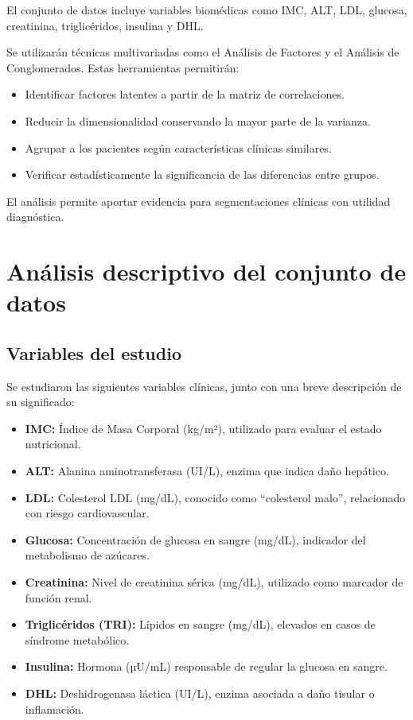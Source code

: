 \documentclass[12pt]{report}
\begin{document}
El conjunto de datos incluye variables biomédicas como IMC, ALT, LDL, glucosa, creatinina, triglicéridos, insulina y DHL. 

Se utilizarán técnicas multivariadas como el Análisis de Factores y el Análisis de Conglomerados. Estas herramientas permitirán:

\begin{itemize}
    \item Identificar factores latentes a partir de la matriz de correlaciones.
    \item Reducir la dimensionalidad conservando la mayor parte de la varianza.
    \item Agrupar a los pacientes según características clínicas similares.
    \item Verificar estadísticamente la significancia de las diferencias entre grupos.
\end{itemize}

El análisis permite aportar evidencia para segmentaciones clínicas con utilidad diagnóstica.

\chapter{Análisis descriptivo del conjunto de datos}

\section{Variables del estudio}
Se estudiaron las siguientes variables clínicas, junto con una breve descripción de su significado:

\begin{itemize}
    \item \textbf{IMC:} Índice de Masa Corporal (kg/m²), utilizado para evaluar el estado nutricional.
    \item \textbf{ALT:} Alanina aminotransferasa (UI/L), enzima que indica daño hepático.
    \item \textbf{LDL:} Colesterol LDL (mg/dL), conocido como “colesterol malo”, relacionado con riesgo cardiovascular.
    \item \textbf{Glucosa:} Concentración de glucosa en sangre (mg/dL), indicador del metabolismo de azúcares.
    \item \textbf{Creatinina:} Nivel de creatinina sérica (mg/dL), utilizado como marcador de función renal.
    \item \textbf{Triglicéridos (TRI):} Lípidos en sangre (mg/dL), elevados en casos de síndrome metabólico.
    \item \textbf{Insulina:} Hormona (µU/mL) responsable de regular la glucosa en sangre.
    \item \textbf{DHL:} Deshidrogenasa láctica (UI/L), enzima asociada a daño tisular o inflamación.
\end{itemize}
\end{document}
